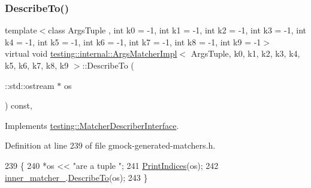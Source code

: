 \subsubsection{\texorpdfstring{Describe\+To()}{DescribeTo()}}
{\footnotesize\ttfamily template$<$class Args\+Tuple , int k0 = -\/1, int k1 = -\/1, int k2 = -\/1, int k3 = -\/1, int k4 = -\/1, int k5 = -\/1, int k6 = -\/1, int k7 = -\/1, int k8 = -\/1, int k9 = -\/1$>$ \\
virtual void \hyperlink{classtesting_1_1internal_1_1ArgsMatcherImpl}{testing\+::internal\+::\+Args\+Matcher\+Impl}$<$ Args\+Tuple, k0, k1, k2, k3, k4, k5, k6, k7, k8, k9 $>$\+::Describe\+To (\begin{DoxyParamCaption}\item[{\+::std\+::ostream $\ast$}]{os }\end{DoxyParamCaption}) const\hspace{0.3cm}{\ttfamily [inline]}, {\ttfamily [virtual]}}



Implements \hyperlink{classtesting_1_1MatcherDescriberInterface_ad9f861588bd969b6e3e717f13bb94e7b}{testing\+::\+Matcher\+Describer\+Interface}.



Definition at line 239 of file gmock-\/generated-\/matchers.\+h.


\begin{DoxyCode}
239                                                 \{
240     *os << \textcolor{stringliteral}{"are a tuple "};
241     \hyperlink{classtesting_1_1internal_1_1ArgsMatcherImpl_a2ea95d7970a1874c9616e42009ae53b0}{PrintIndices}(os);
242     \hyperlink{classtesting_1_1internal_1_1ArgsMatcherImpl_a719ba7e85d3381661021d699c9978ed0}{inner\_matcher\_}.\hyperlink{classtesting_1_1internal_1_1MatcherBase_a7e0c883c7745e0d646463077ef1c1267}{DescribeTo}(os);
243   \}
\end{DoxyCode}
\mbox{\label{classtesting_1_1internal_1_1ArgsMatcherImpl_a168a7d6a82bd20fd6b1c777ab64c34a5}} 
